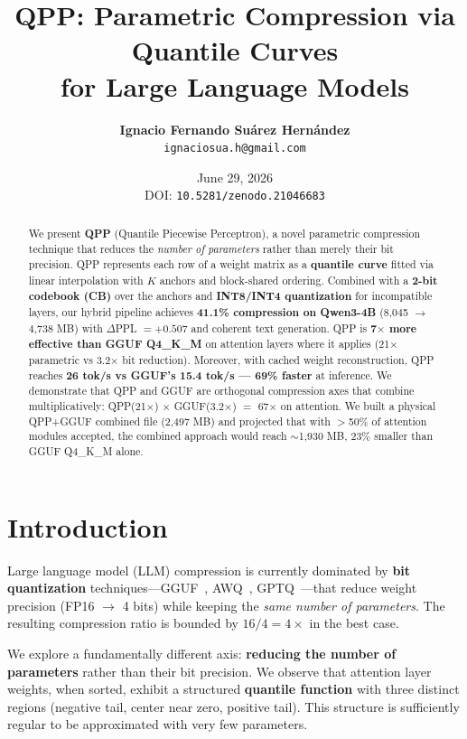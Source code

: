 \documentclass[11pt,a4paper]{article}
\title{\textbf{QPP: Parametric Compression via Quantile Curves\\for Large Language Models}}
\author{\textbf{Ignacio Fernando Suárez Hernández}\\ \small\texttt{ignaciosua.h@gmail.com}}
\date{June 29, 2026 \\ \small DOI: \texttt{10.5281/zenodo.21046683}}
\begin{document}
\maketitle

\begin{abstract}
We present \textbf{QPP} (Quantile Piecewise Perceptron), a novel parametric compression technique that reduces the \textit{number of parameters} rather than merely their bit precision. QPP represents each row of a weight matrix as a \textbf{quantile curve} fitted via linear interpolation with $K$ anchors and block-shared ordering. Combined with a \textbf{2-bit codebook (CB)} over the anchors and \textbf{INT8/INT4 quantization} for incompatible layers, our hybrid pipeline achieves \textbf{41.1\% compression on Qwen3-4B} (8,045 $\rightarrow$ 4,738 MB) with $\Delta$PPL $= +0.507$ and coherent text generation. QPP is \textbf{7$\times$ more effective than GGUF Q4\_K\_M} on attention layers where it applies (21$\times$ parametric vs 3.2$\times$ bit reduction). Moreover, with cached weight reconstruction, QPP reaches \textbf{26 tok/s vs GGUF's 15.4 tok/s — 69\% faster} at inference. We demonstrate that QPP and GGUF are orthogonal compression axes that combine multiplicatively: QPP(21$\times$) $\times$ GGUF(3.2$\times$) $=$ 67$\times$ on attention. We built a physical QPP+GGUF combined file (2,497 MB) and projected that with $>$50\% of attention modules accepted, the combined approach would reach $\sim$1,930 MB, 23\% smaller than GGUF Q4\_K\_M alone.
\end{abstract}


\section{Introduction}

Large language model (LLM) compression is currently dominated by \textbf{bit quantization} techniques---GGUF~\cite{gguf}, AWQ~\cite{awq}, GPTQ~\cite{gptq}---that reduce weight precision (FP16 $\rightarrow$ 4 bits) while keeping the \textit{same number of parameters}. The resulting compression ratio is bounded by $16/4 = 4\times$ in the best case.

We explore a fundamentally different axis: \textbf{reducing the number of parameters} rather than their bit precision. We observe that attention layer weights, when sorted, exhibit a structured \textbf{quantile function} with three distinct regions (negative tail, center near zero, positive tail). This structure is sufficiently regular to be approximated with very few parameters.
\end{document}
